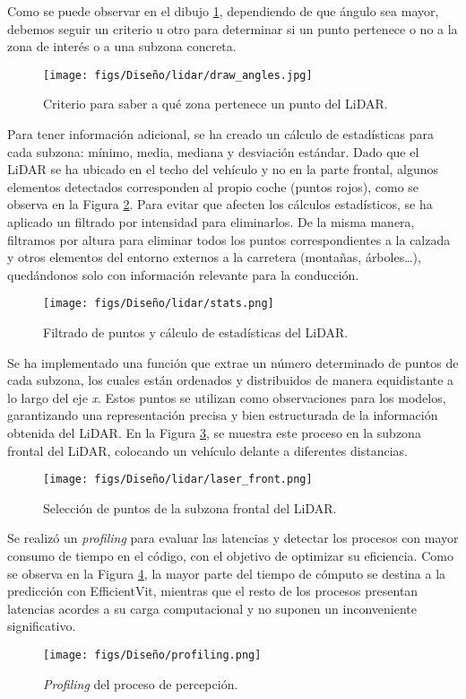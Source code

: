 \newpage

Como se puede observar en el dibujo \ref{fig:dib_angle}, dependiendo de que ángulo sea mayor, debemos seguir un criterio u otro para determinar si un punto pertenece o no a la zona de interés o a una subzona concreta.
\begin{figure}[ht]
  \centering
  \texttt{[image: figs/Diseño/lidar/draw\_angles.jpg]}
  \caption{Criterio para saber a qué zona pertenece un punto del \ac{LiDAR}.}
  \label{fig:dib_angle}
\end{figure}

Para tener información adicional, se ha creado un cálculo de estadísticas para cada subzona: mínimo, media, mediana y desviación estándar. Dado que el \ac{LiDAR} se ha ubicado en el techo del vehículo y no en la parte frontal, algunos elementos detectados corresponden al propio coche (puntos rojos), como se observa en la Figura \ref{fig:stats_lidar}. Para evitar que afecten los cálculos estadísticos, se ha aplicado un filtrado por intensidad para eliminarlos. De la misma manera, filtramos por altura para eliminar todos los puntos correspondientes a la calzada y otros elementos del entorno externos a la carretera (montañas, árboles…), quedándonos solo con información relevante para la conducción.
\begin{figure}[ht]
  \centering
  \texttt{[image: figs/Diseño/lidar/stats.png]}
  \caption{Filtrado de puntos y cálculo de estadísticas del \ac{LiDAR}.}
  \label{fig:stats_lidar}
\end{figure}

\newpage

Se ha implementado una función que extrae un número determinado de puntos de cada subzona, los cuales están ordenados y distribuidos de manera equidistante a lo largo del eje \textit{x}. Estos puntos se utilizan como observaciones para los modelos, garantizando una representación precisa y bien estructurada de la información obtenida del \ac{LiDAR}. En la Figura \ref{fig:laser_front}, se muestra este proceso en la subzona frontal del \ac{LiDAR}, colocando un vehículo delante a diferentes distancias.
\begin{figure}[ht]
\centering
\texttt{[image: figs/Diseño/lidar/laser\_front.png]}
\caption{Selección de puntos de la subzona frontal del \ac{LiDAR}.}
\label{fig:laser_front}
\end{figure}

Se realizó un \textit{profiling} para evaluar las latencias y detectar los procesos con mayor consumo de tiempo en el código, con el objetivo de optimizar su eficiencia. Como se observa en la Figura \ref{fig:profiling}, la mayor parte del tiempo de cómputo se destina a la predicción con EfficientVit, mientras que el resto de los procesos presentan latencias acordes a su carga computacional y no suponen un inconveniente significativo.
\begin{figure}[ht]
  \centering
  \texttt{[image: figs/Diseño/profiling.png]}
  \caption{\textit{Profiling} del proceso de percepción.}
  \label{fig:profiling}
\end{figure}


